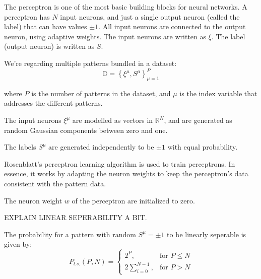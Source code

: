 The perceptron is one of the most basic building blocks for neural networks.
A perceptron has \(N\) input neurons, and just a single output neuron (called the label) that can have values \(\pm1\).
All input neurons are connected to the output neuron, using adaptive weights.
The input neurons are written as \(\xi\).
The label (output neuron) is written as \(S\).

We're regarding multiple patterns bundled in a dataset:
\[ \mathbb{D} = \left\{ \xi^\mu, S^\mu \right\} _{\mu=1}^{P} \]

where \(P\) is the number of patterns in the dataset, and \(\mu\) is the index variable that addresses the different patterns.

The input neurons \(\xi^\mu\) are modelled as vectors in \(\mathbb{R}^N\), and are generated as random Gaussian components between zero and one.

The labels \(S^\mu\) are generated independently to be \(\pm1\) with equal probability.

Rosenblatt's perceptron learning algorithm\cite{rosenblatt1958perceptron} is used to train perceptrons.
In essence, it works by adapting the neuron weights to keep the perceptron's data consistent with the pattern data.

The neuron weight \(w\) of the perceptron are initialized to zero.

EXPLAIN LINEAR SEPERABILITY A BIT.

The probability for a pattern with random \(S^\mu = \pm1\) to be linearly seperable is given by\cite{perceptron_slides2}:
\[
P_{l.s.}(P, N) = 
\begin{cases}
2^P,& \text{for } P\leq N \\
    2\sum_{i=0}^{N-1},              & \text{for } P > N
\end{cases}
\]